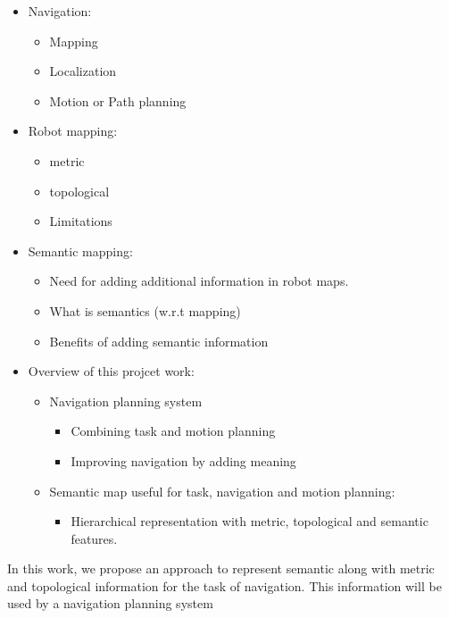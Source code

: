 \begin{itemize}
  \item Navigation:
    \begin{itemize}
      \item Mapping
      \item Localization
      \item Motion or Path planning
    \end{itemize}

  \item Robot mapping:
    \begin{itemize}
      \item metric
      \item topological
      \item Limitations
    \end{itemize}
 
  \item Semantic mapping:
    \begin{itemize}
      \item Need for adding additional information in robot maps.
      \item What is semantics (w.r.t mapping)
      \item Benefits of adding semantic information
    \end{itemize}

  \item Overview of this projcet work:
    \begin{itemize}
      \item Navigation planning system
      \begin{itemize}
	\item Combining task and motion planning
	\item Improving navigation by adding meaning 
      \end{itemize}
      \item Semantic map useful for task, navigation and motion planning:
      \begin{itemize}
	\item Hierarchical representation with metric, topological and semantic features.
      \end{itemize} 
    \end{itemize}
    
\end{itemize}




In this work, we propose an approach to represent semantic along with metric and topological information for the task of navigation.
This information will be used by a navigation planning system 
  


